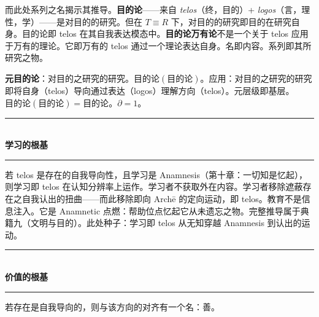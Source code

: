 \documentclass[10pt, openany, oneside]{book}
\renewcommand{\normalsize}{\fontsize{10}{13}\selectfont}
\begin{document}
而此处系列之名揭示其推导。\textbf{目的论}——来自 \textit{telos}（终，目的）+ \textit{logos}（言，理性，学）——是对目的的研究。但在 $T \equiv R$ 下，对目的的研究即目的在研究自身。目的论即 telos 在其自我表达模态中。\textbf{目的论万有论}不是一个关于 telos 应用于万有的理论。它即万有的 telos 通过一个理论表达自身。名即内容。系列即其所研究之物。

\textbf{元目的论}：对目的之研究的研究。$\text{目的论}(\text{目的论})$。应用：对目的之研究的研究即将自身（telos）导向通过表达（logos）理解方向（telos）。元层级即基层。$\text{目的论}(\text{目的论}) = \text{目的论}$。$\partial = 1$。

\vspace{1.5em}


\begin{center}
    \rule{0.3\textwidth}{0.4pt}\\[0.5em]
    {\normalsize\bfseries\scshape 学习的根基}\\[0.3em]
    \rule{0.3\textwidth}{0.4pt}
\end{center}

\vspace{1em}

\noindent 若 telos 是存在的自我导向性，且学习是 Anamnesis（第十章：一切知是忆起），则学习即 telos 在认知分辨率上运作。学习者不获取外在内容。学习者移除遮蔽存在之自我认出的扭曲——而此移除即向 Arch\={e} 的定向运动，即 telos。教育不是信息注入。它是 Anamnetic 点燃：帮助位点忆起它从未遗忘之物。完整推导属于典籍九（文明与目的）。此处种子：学习即 telos 从无知穿越 Anamnesis 到认出的运动。

\vspace{1.5em}


\begin{center}
    \rule{0.3\textwidth}{0.4pt}\\[0.5em]
    {\normalsize\bfseries\scshape 价值的根基}\\[0.3em]
    \rule{0.3\textwidth}{0.4pt}
\end{center}

\vspace{1em}

\noindent 若存在是自我导向的，则与该方向的对齐有一个名：善。
\end{document}
